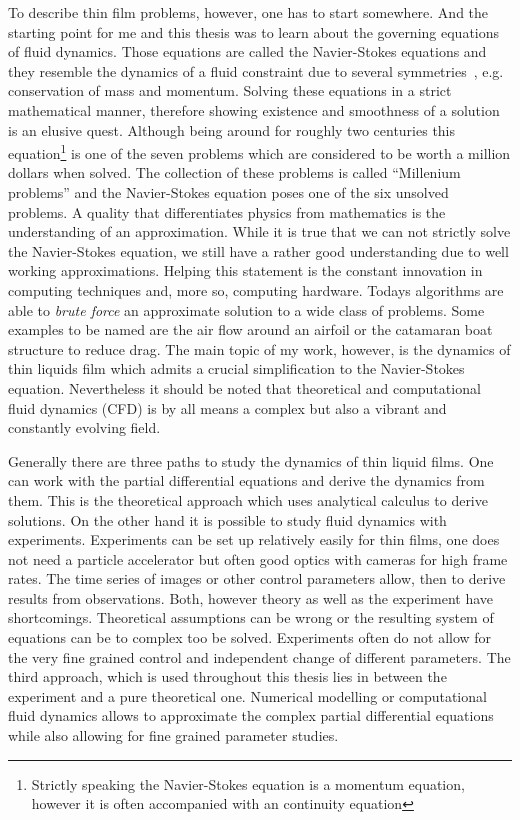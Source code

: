 To describe thin film problems, however, one has to start somewhere.
And the starting point for me and this thesis was to learn about the governing equations of fluid dynamics. 
Those equations are called the Navier-Stokes equations and they resemble the dynamics of a fluid constraint due to several symmetries~\cite{Navier, Stokes}, e.g. conservation of mass and momentum.
Solving these equations in a strict mathematical manner, therefore showing existence and smoothness of a solution is an elusive quest. 
Although being around for roughly two centuries this equation\footnote{Strictly speaking the Navier-Stokes equation is a momentum equation, however it is often accompanied with an continuity equation} is one of the seven problems which are considered to be worth a million dollars when solved. 
The collection of these problems is called ``Millenium problems'' and the Navier-Stokes equation poses one of the six unsolved problems.
A quality that differentiates physics from mathematics is the understanding of an approximation.
While it is true that we can not strictly solve the Navier-Stokes equation, we still have a rather good understanding due to well working approximations.
Helping this statement is the constant innovation in computing techniques and, more so, computing hardware. 
Todays algorithms are able to \textit{brute force} an approximate solution to a wide class of problems.  
Some examples to be named are the air flow around an airfoil or the catamaran boat structure to reduce drag. 
The main topic of my work, however, is the dynamics of thin liquids film which admits a crucial simplification to the Navier-Stokes equation. 
Nevertheless it should be noted that theoretical and computational fluid dynamics (CFD) is by all means a complex but also a vibrant and constantly evolving field.

Generally there are three paths to study the dynamics of thin liquid films.
One can work with the partial differential equations and derive the dynamics from them. 
This is the theoretical approach which uses analytical calculus to derive solutions.
On the other hand it is possible to study fluid dynamics with experiments.
Experiments can be set up relatively easily for thin films, one does not need a particle accelerator but often good optics with cameras for high frame rates. 
The time series of images or other control parameters allow, then to derive results from observations.
Both, however theory as well as the experiment have shortcomings. 
Theoretical assumptions can be wrong or the resulting system of equations can be to complex too be solved. 
Experiments often do not allow for the very fine grained control and independent change of different parameters.
The third approach, which is used throughout this thesis lies in between the experiment and a pure theoretical one.
Numerical modelling or computational fluid dynamics allows to approximate the complex partial differential equations while also allowing for fine grained parameter studies.

